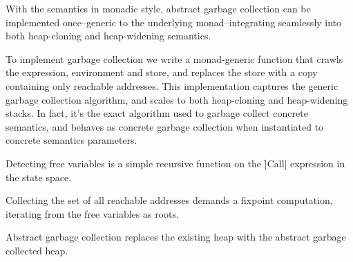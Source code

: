 With the semantics in monadic style, abstract garbage collection can be
implemented once--generic to the underlying monad--integrating seamlessly into
both heap-cloning and heap-widening semantics.


To implement garbage collection we write a monad-generic function that crawls
the expression, environment and store, and replaces the store with a copy
containing only reachable addresses.
%
This implementation captures the generic garbage collection algorithm, and
scales to both heap-cloning and heap-widening stacks.
%
In fact, it's the exact algorithm used to garbage collect concrete semantics,
and behaves as concrete garbage collection when instantiated to concrete
semantics parameters.


Detecting free variables is a simple recursive function on the \h|Call|
expression in the state space.
%


Collecting the set of all reachable addresses demands a fixpoint computation,
iterating from the free variables as roots.
%


Abstract garbage collection replaces the existing heap with the abstract
garbage collected heap.
%
